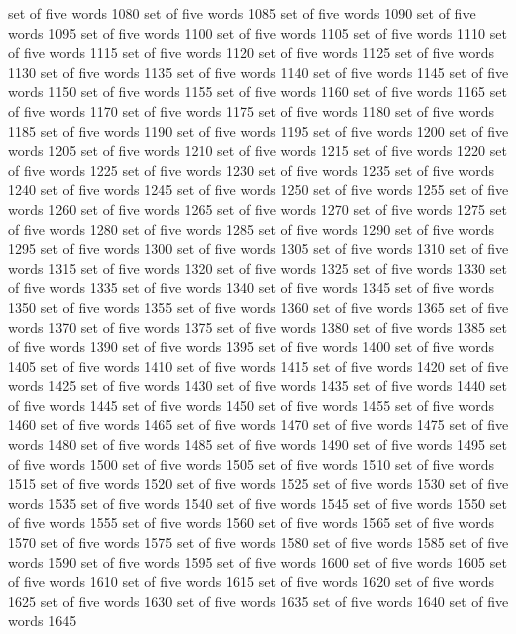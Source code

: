 set	of	five	words	1080
set	of	five	words	1085
set	of	five	words	1090
set	of	five	words	1095
set	of	five	words	1100
set	of	five	words	1105
set	of	five	words	1110
set	of	five	words	1115
set	of	five	words	1120
set	of	five	words	1125
set	of	five	words	1130
set	of	five	words	1135
set	of	five	words	1140
set	of	five	words	1145
set	of	five	words	1150
set	of	five	words	1155
set	of	five	words	1160
set	of	five	words	1165
set	of	five	words	1170
set	of	five	words	1175
set	of	five	words	1180
set	of	five	words	1185
set	of	five	words	1190
set	of	five	words	1195
set	of	five	words	1200
set	of	five	words	1205
set	of	five	words	1210
set	of	five	words	1215
set	of	five	words	1220
set	of	five	words	1225
set	of	five	words	1230
set	of	five	words	1235
set	of	five	words	1240
set	of	five	words	1245
set	of	five	words	1250
set	of	five	words	1255
set	of	five	words	1260
set	of	five	words	1265
set	of	five	words	1270
set	of	five	words	1275
set	of	five	words	1280
set	of	five	words	1285
set	of	five	words	1290
set	of	five	words	1295
set	of	five	words	1300
set	of	five	words	1305
set	of	five	words	1310
set	of	five	words	1315
set	of	five	words	1320
set	of	five	words	1325
set	of	five	words	1330
set	of	five	words	1335
set	of	five	words	1340
set	of	five	words	1345
set	of	five	words	1350
set	of	five	words	1355
set	of	five	words	1360
set	of	five	words	1365
set	of	five	words	1370
set	of	five	words	1375
set	of	five	words	1380
set	of	five	words	1385
set	of	five	words	1390
set	of	five	words	1395
set	of	five	words	1400
set	of	five	words	1405
set	of	five	words	1410
set	of	five	words	1415
set	of	five	words	1420
set	of	five	words	1425
set	of	five	words	1430
set	of	five	words	1435
set	of	five	words	1440
set	of	five	words	1445
set	of	five	words	1450
set	of	five	words	1455
set	of	five	words	1460
set	of	five	words	1465
set	of	five	words	1470
set	of	five	words	1475
set	of	five	words	1480
set	of	five	words	1485
set	of	five	words	1490
set	of	five	words	1495
set	of	five	words	1500
set	of	five	words	1505
set	of	five	words	1510
set	of	five	words	1515
set	of	five	words	1520
set	of	five	words	1525
set	of	five	words	1530
set	of	five	words	1535
set	of	five	words	1540
set	of	five	words	1545
set	of	five	words	1550
set	of	five	words	1555
set	of	five	words	1560
set	of	five	words	1565
set	of	five	words	1570
set	of	five	words	1575
set	of	five	words	1580
set	of	five	words	1585
set	of	five	words	1590
set	of	five	words	1595
set	of	five	words	1600
set	of	five	words	1605
set	of	five	words	1610
set	of	five	words	1615
set	of	five	words	1620
set	of	five	words	1625
set	of	five	words	1630
set	of	five	words	1635
set	of	five	words	1640
set	of	five	words	1645
